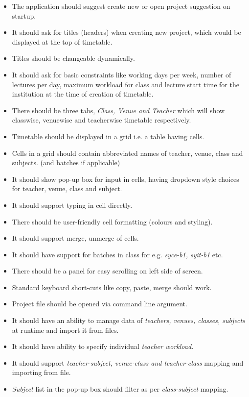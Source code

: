 \begin{itemize}
\item The application should suggest create new or open project suggestion on startup.
\item It should ask for titles (headers) when creating new project, which would be displayed at the top of timetable. 
\item Titles should be changeable dynamically.
\item It should ask for basic constraints like working days per week, number of lectures per day, maximum workload for class and lecture start time for the institution at the time of creation of timetable.
\item There should be three tabs, \textit{Class, Venue and Teacher} which will show classwise, venuewise and teacherwise timetable respectively.
\item Timetable should be displayed in a grid i.e. a table having cells.
\item Cells in a grid should contain abbreviated names of teacher, venue, class and subjects. (and batches if applicable)
\item It should show pop-up box for input in cells, having dropdown style choices for teacher, venue, class and subject.
\item It should support typing in cell directly.
\item There should be user-friendly cell formatting (colours and styling).
\item It should support merge, unmerge of cells.
\item It should have support for batches in class for e.g. \textit{syce-b1, syit-b1} etc.
\item There should be a panel for easy scrolling on left side of screen.
\item Standard keyboard short-cuts like copy, paste, merge should work.
\item Project file should be opened via command line argument.
\item It should have an ability to manage data of \textit{teachers, venues, classes, subjects} at runtime and import it from files.
\item It should have ability to specify individual \textit{teacher workload.}
\item It should support \textit{teacher-subject, venue-class and teacher-class} mapping and importing from file.
\item \textit{Subject} list in the pop-up box should filter as per \textit{class-subject} mapping.

\end{itemize}

